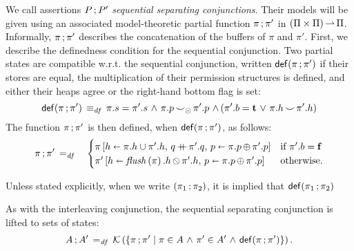 \documentclass[11pt]{report}
\begin{document}
We call assertions $P \operatorname{;} P'$ \emph{sequential separating conjunctions}. Their models will be given using an associated model-theoretic partial function $\pi \operatorname{;} \pi'$ in $(\Pi \times \Pi) \operatorname{\rightharpoonup} \Pi$. Informally, $\pi \operatorname{;} \pi'$ describes the concatenation of the buffers of $\pi$ and $\pi'$. First, we describe the definedness condition for the sequential conjunction. Two partial states are compatible w.r.t. the sequential conjunction, written $\mathsf{def}(\pi \operatorname{;} \pi')$ if their stores are equal, the multiplication of their permission structures is defined, and either their heaps agree or the right-hand bottom flag is set: \[ \mathsf{def}(\pi \operatorname{;} \pi') \operatorname{\;\equiv_{\mathit{df}}\;} \pi.s = \pi'.s \operatorname{\,\wedge\,} \pi.p \operatorname{\smile}_{\operatorname{\odot}} \pi'.p \operatorname{\,\wedge\,} (\pi'.b = \mathbf{t} \operatorname{\,\vee\,} \pi.h \operatorname{\smile} \pi'.h)\]
The function $\pi \operatorname{;} \pi'$ is then defined, when $\mathsf{def}(\pi \operatorname{;} \pi')$, as follows: \begin{eqnarray*}
	\pi \seq \pi' & \eqdef & \begin{cases}
		\funup{\pi}{\ptup{h}{\pi.h \cup \pi'.h},\,\ptapp{q}{\pi'.q},\,\ptup{p}{\pi.p \shadd \pi'.p}} & \text{if $\pi'.b = \bvf$} \\
		\funup{\pi'}{\ptup{h}{\sflush{\pi}.h \override \pi'.h},\, \ptup{p}{\pi.p \shadd \pi'.p}}  & \text{otherwise.}
	\end{cases}
\end{eqnarray*}

Unless stated explicitly, when we write $(\pi_1 \operatorname{;} \pi_2)$, it is implied that $\mathsf{def}(\pi_1 \operatorname{;} \pi_2)$

As with the interleaving conjunction, the sequential separating conjunction is lifted to sets of states: \[ A \operatorname{;} A' \operatorname{\;=_{\mathit{df}}\;} \mathcal{K}\left(\left\lbrace \pi \operatorname{;} \pi' \mid \pi \in A \operatorname{\,\wedge\,} \pi' \in A' \operatorname{\,\wedge\,} \mathsf{def}(\pi \operatorname{;} \pi') \right\rbrace\right).\] 
\end{document}
